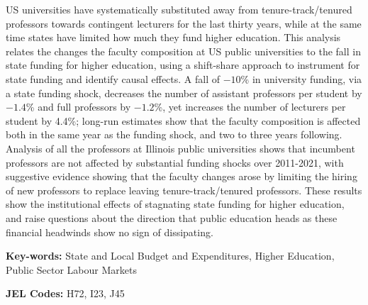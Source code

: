 US universities have systematically substituted away from tenure-track/tenured professors towards contingent lecturers for the last thirty years, while at the same time states have limited how much they fund higher education.
This analysis relates the changes the faculty composition at US public universities to the fall in state funding for higher education, using a shift-share approach to instrument for state funding and identify causal effects.
A fall of $-10$\% in university funding, via a state funding shock, decreases the number of assistant professors per student by $-1.4$\% and full professors by $-1.2$\%, yet increases the number of lecturers per student by 4.4\%; long-run estimates show that the faculty composition is affected both in the same year as the funding shock, and two to three years following.
Analysis of all the professors at Illinois public universities shows that incumbent professors are not affected by substantial funding shocks over 2011-2021, with suggestive evidence showing that the faculty changes arose by limiting the hiring of new professors to replace leaving tenure-track/tenured professors.
These results show the institutional effects of stagnating state funding for higher education, and raise questions about the direction that public education heads as these financial headwinds show no sign of dissipating.

\vfill
\noindent
\textbf{Key-words:}
State and Local Budget and Expenditures,
Higher Education,
Public Sector Labour Markets

\vspace{0.1cm}
\noindent
\textbf{JEL Codes:} H72, I23, J45
